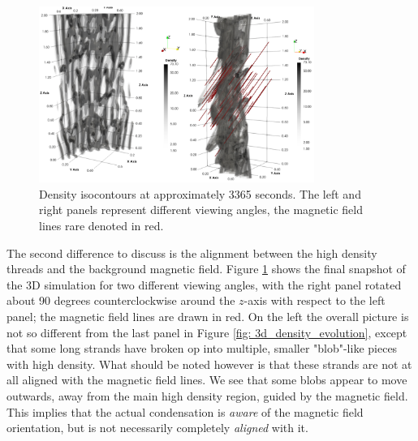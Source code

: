 \begin{figure}[t]
  \centering
  \includegraphics[width=0.8\textwidth]{3d_density_final.png}
  \caption{
    Density isocontours at approximately 3365 seconds. The left and right panels represent different viewing angles, the magnetic field lines rare denoted in red.
  }
  \label{fig: 3d_density_final}
\end{figure}

The second difference to discuss is the alignment between the high density threads and the background magnetic field. Figure \ref{fig: 3d_density_final} shows the final snapshot of the 3D simulation for two different viewing angles, with the right panel rotated about 90 degrees counterclockwise around the $z$-axis with respect to the left panel; the magnetic field lines are drawn in red. On the left the overall picture is not so different from the last panel in Figure \ref{fig: 3d_density_evolution}, except that some long strands have broken op into multiple, smaller "blob"-like pieces with high density. What should be noted however is that these strands are not at all aligned with the magnetic field lines. We see that some blobs appear to move outwards, away from the main high density region, guided by the magnetic field. This implies that the actual condensation is \emph{aware} of the magnetic field orientation, but is not necessarily completely \emph{aligned} with it.

